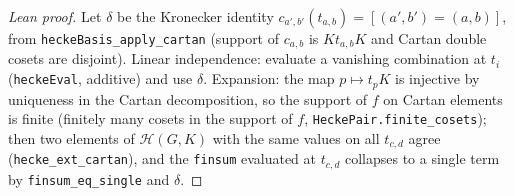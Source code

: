 \begin{proof}[Lean proof]
Let $\delta$ be the Kronecker identity $c_{a',b'}(t_{a,b})=[(a',b')=(a,b)]$, from \texttt{heckeBasis\_apply\_cartan} (support of $c_{a,b}$ is $Kt_{a,b}K$ and Cartan double cosets are disjoint). Linear independence: evaluate a vanishing combination at $t_{i}$ (\texttt{heckeEval}, additive) and use $\delta$. Expansion: the map $p\mapsto t_pK$ is injective by uniqueness in the Cartan decomposition, so the support of $f$ on Cartan elements is finite (finitely many cosets in the support of $f$, \texttt{HeckePair.finite\_cosets}); then two elements of $\mathcal H(G,K)$ with the same values on all $t_{c,d}$ agree (\texttt{hecke\_ext\_cartan}), and the \texttt{finsum} evaluated at $t_{c,d}$ collapses to a single term by \texttt{finsum\_eq\_single} and $\delta$.
\end{proof}

